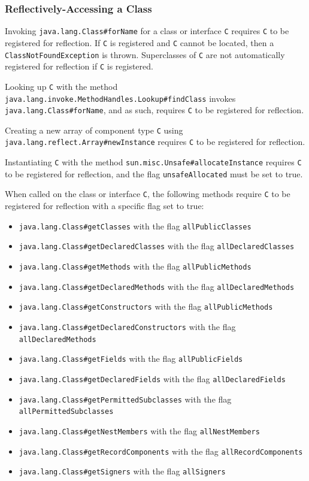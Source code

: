 \subsubsection{Reflectively-Accessing a Class}

Invoking \texttt{java.lang.Class\#forName} for a class or interface \verb|C| requires \verb|C| to be registered for reflection. If \verb|C| is registered and \verb|C| cannot be located, then a \texttt{ClassNotFoundException} is thrown. Superclasses of \verb|C| are not automatically registered for reflection if \verb|C| is registered.

Looking up \verb|C| with the method \texttt{java.lang.invoke.MethodHandles.Lookup\#findClass} invokes \texttt{java.lang.Class\#forName}, and as such, requires \verb|C| to be registered for reflection.

Creating a new array of component type \verb|C| using \texttt{java.lang.reflect.Array\#newInstance} requires \verb|C| to be registered for reflection.

Instantiating \verb|C| with the method \texttt{sun.misc.Unsafe\#allocateInstance} requires \verb|C| to be registered for reflection, and the flag \texttt{unsafeAllocated} must be set to true.

When called on the class or interface \verb|C|, the following methods require \verb|C| to be registered for reflection with a specific flag set to true:
\begin{itemize}
    \item \texttt{java.lang.Class\#getClasses} with the flag \texttt{allPublicClasses} 
    \item \texttt{java.lang.Class\#getDeclaredClasses} with the flag \texttt{allDeclaredClasses} 
    \item \texttt{java.lang.Class\#getMethods} with the flag \texttt{allPublicMethods} 
    \item \texttt{java.lang.Class\#getDeclaredMethods} with the flag \texttt{allDeclaredMethods} 
    \item \texttt{java.lang.Class\#getConstructors} with the flag \texttt{allPublicMethods} 
    \item \texttt{java.lang.Class\#getDeclaredConstructors} with the flag \texttt{allDeclaredMethods} 
    \item \texttt{java.lang.Class\#getFields} with the flag \texttt{allPublicFields} 
    \item \texttt{java.lang.Class\#getDeclaredFields} with the flag \texttt{allDeclaredFields} 
    \item \texttt{java.lang.Class\#getPermittedSubclasses} with the flag \texttt{allPermittedSubclasses} 
    \item \texttt{java.lang.Class\#getNestMembers} with the flag \texttt{allNestMembers} 
    \item \texttt{java.lang.Class\#getRecordComponents} with the flag \texttt{allRecordComponents} 
    \item \texttt{java.lang.Class\#getSigners} with the flag \texttt{allSigners}
\end{itemize}

